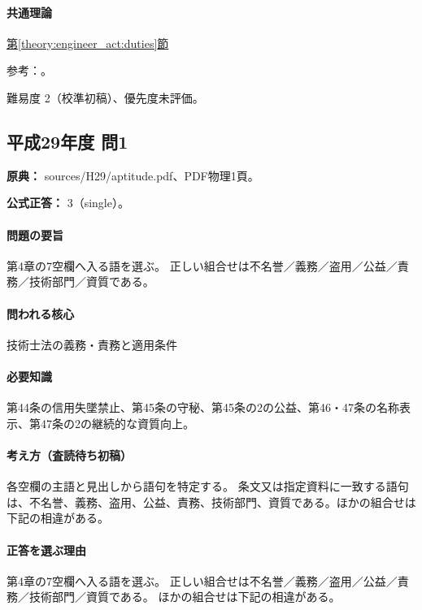 \paragraph{共通理論} \hyperref[theory:engineer_act:duties]{第\ref*{theory:engineer_act:duties}節}

\par 参考：\cite{engineer_act_current}。

\par 難易度 2（校準初稿）、優先度未評価。

\subsection{平成29年度 問1}
\label{q:h29-reg-apt-01}

\noindent\textbf{原典：} sources/H29/aptitude.pdf、PDF物理1頁。

\textbf{公式正答：} 3（single）。

\paragraph{問題の要旨} 第4章の7空欄へ入る語を選ぶ。 正しい組合せは不名誉／義務／盗用／公益／責務／技術部門／資質である。

\paragraph{問われる核心} 技術士法の義務・責務と適用条件

\paragraph{必要知識} 第44条の信用失墜禁止、第45条の守秘、第45条の2の公益、第46・47条の名称表示、第47条の2の継続的な資質向上。

\paragraph{考え方（査読待ち初稿）} 各空欄の主語と見出しから語句を特定する。 条文又は指定資料に一致する語句は、不名誉、義務、盗用、公益、責務、技術部門、資質である。ほかの組合せは下記の相違がある。

\paragraph{正答を選ぶ理由} 第4章の7空欄へ入る語を選ぶ。 正しい組合せは不名誉／義務／盗用／公益／責務／技術部門／資質である。 ほかの組合せは下記の相違がある。

